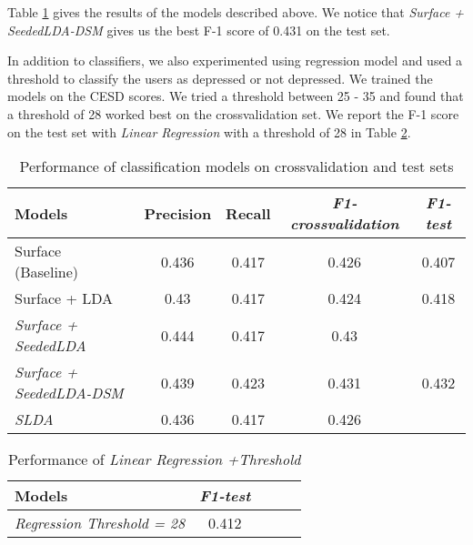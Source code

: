 Table \ref{table:results_1} gives the results of the models described above. We notice that  \textit{Surface + SeededLDA-DSM} gives us the best F-1 score of 0.431 on the test set.

In addition to classifiers, we also experimented using regression model and used a threshold to classify the users as depressed or not depressed. We trained the models on the CESD scores. We tried a threshold between 25 - 35 and found that a threshold of 28 worked best on the crossvalidation set. We report the F-1 score on the test set with \textit{Linear Regression} with a threshold of 28 in Table \ref{table:results_2}. 


\begin{table} [ht!]
\begin{tabular}{lcccc}
\toprule
Models & Precision & Recall & \textit{F1-crossvalidation} & \textit{F1-test}  \\
\midrule
Surface (Baseline) & 0.436 & 0.417 & 0.426 &  0.407\\
Surface + LDA & 0.43 & 0.417 & 0.424 &  0.418 \\
\textit{Surface + SeededLDA} &  0.444&  0.417& 0.43 &  \\
\textit{Surface + SeededLDA-{DSM}} & 0.439 & 0.423 & 0.431 & 0.432 \\
\textit{SLDA } & 0.436 & 0.417 & 0.426 &  \\
\bottomrule
\end{tabular}
\caption{Performance of classification models on crossvalidation and test sets}
\label{table:results_1}

\end{table}
\begin{table} [ht!]
\begin{tabular}{lcccc}
\toprule
Models & \textit{F1-test}  \\
\midrule
\textit{Regression Threshold = 28 } & 0.412 \\
\bottomrule
\end{tabular}
\caption{Performance of \textit{Linear Regression +Threshold}}
\label{table:results_2}
\end{table}

 
